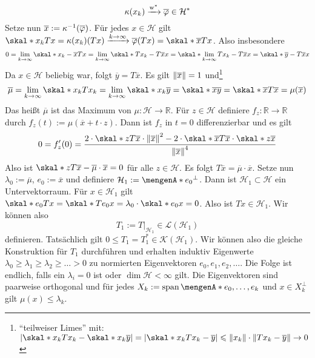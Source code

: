 \[
	\kappa(x_k) \xrightarrow{\mathrm{w}^*} \overline{\varphi} \in \mathcal{H}^*
\]
Setze nun $\overline{x} := \kappa ^{-1}\enbrace*{\overline{\varphi}}$. Für jedes $x \in \mathcal{H}$ gilt  
$\skal*{x_k}{T x} = \kappa(x_k)(T x) \xrightarrow{k \to \infty} \overline{\varphi}(T x) = \skal*{\overline{x}}{T x}$. Also insbesondere
\[
	0 = \lim_{k\to \infty} \skal*{x_k -\overline{x}}{T x} = \lim_{ k \to \infty} \skal*{T x_k - T \overline{x}}{x}= \skal*{\lim_{ k \to \infty} T x_k - T \overline{x} }{x}
	= \skal*{\overline{y} - T \overline{x}}{x}
\]
Da $x \in \mathcal{H}$ beliebig war, folgt $\overline{y}=T \overline{x}$. Es gilt $\norm{\overline{x}}=1$ und\footnote{\enquote{teilweiser Limes} mit: 
$\abs*{\skal*{x_k}{T x_k} - \skal*{x_k}{\overline{y}}}=\abs*{\skal*{x_k}{T x_k - \overline{y}}} \le \norm{x_k} \cdot \norm{T x_k - \overline{y}} \to 0$}
\[
	\overline{\mu} = \lim_{ k \to \infty} \skal*{x_k}{T x_k} = \lim_{ k \to \infty}  \skal*{x_k}{\overline{y}} = \skal*{\overline{x}}{\overline{y}} = 
	\skal*{\overline{x}}{T \overline{x}} = \mu(\overline{x})
\]
Das heißt $\overline{\mu}$ ist das Maximum von $\mu \colon \mathcal{H} \to \mathds{R}$. Für $z \in \mathcal{H}$ definiere $f_z \colon \mathds{R} \to \mathds{R}$ durch
$f_z(t) := \mu(\overline{x}+ t \cdot z)$. Dann ist $f_z$ in $t=0$ differenzierbar und es gilt
\[
	0 = f_z'(0) = \frac{2 \cdot \skal*{z}{T \overline{x}} \cdot \norm{\overline{x}}^2 - 2 \cdot \skal*{\overline{x}}{T \overline{x}} \cdot 
	\skal*{z}{\overline{x}}}{\norm{\overline{x}}^4} 
\]
Also ist $\skal*{z}{T \overline{x} - \overline{\mu} \cdot \overline{x}} =0$ für alle $z \in \mathcal{H}$. Es folgt $T \overline{x}= \overline{\mu} \cdot \overline{x}$.
Setze nun $\lambda_0 := \overline{\mu}$, $e_0:= \overline{x}$ und definiere $\mathcal{H}_1 := \set{e_0}^\bot$. Dann ist $\mathcal{H}_1 \subset \mathcal{H}$ ein Untervektorraum.
Für $x \in \mathcal{H}_1$ gilt $\skal*{e_0}{Tx} = \skal*{T e_0}{x}= \lambda_0 \cdot \skal*{e_0}{x}=0$. Also ist $Tx \in \mathcal{H}_1$. Wir können also 
\[
	T_1 := T\big|_{\mathcal{H}_1} \in \mathcal{L}(\mathcal{H}_1)
\]
definieren. Tatsächlich gilt $0 \le T_1 = T_1^* \in \mathcal{K}(\mathcal{H}_1)$. Wir können also die gleiche Konstruktion für $T_1$ durchführen und erhalten induktiv
Eigenwerte $\lambda_0 \ge \lambda_1 \ge \lambda_2 \ge \ldots>0$ zu normierten Eigenvektoren $e_0, e_1, e_2, \ldots$. Die Folge ist endlich, falls ein $\lambda_i=0$ ist oder 
$\dim \mathcal{H} < \infty$ gilt. Die Eigenvektoren sind paarweise orthogonal und für jedes $X_k := \Span \set{e_0, \ldots ,e_k}$ und $x \in X_k^\bot$ gilt 
$\mu(x) \le \lambda_k$.

